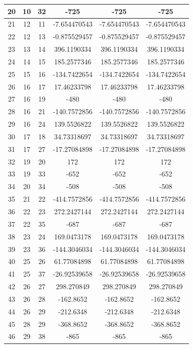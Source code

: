 \documentclass[lettersize,journal]{IEEEtran}
\begin{document}
\begin{table}[htbp]
\begin{tabular}{cccccc}
		\midrule
		20    & 10    & 32    & -725  & -725  & -725 \\
		\midrule
		21    & 12    & 11    & -7.654470543 & -7.654470543 & -7.654470543 \\
		\midrule
		22    & 12    & 13    & -0.875529457 & -0.875529457 & -0.875529457 \\
		\midrule
		23    & 13    & 14    & 396.1190334 & 396.1190334 & 396.1190334 \\
		\midrule
		24    & 14    & 15    & 185.2577346 & 185.2577346 & 185.2577346 \\
		\midrule
		25    & 15    & 16    & -134.7422654 & -134.7422654 & -134.7422654 \\
		\midrule
		26    & 16    & 17    & 17.46233798 & 17.46233798 & 17.46233798 \\
		\midrule
		27    & 16    & 19    & -480  & -480  & -480 \\
		\midrule
		28    & 16    & 21    & -140.7572856 & -140.7572856 & -140.7572856 \\
		\midrule
		29    & 16    & 24    & 139.5526822 & 139.5526822 & 139.5526822 \\
		\midrule
		30    & 17    & 18    & 34.73318697 & 34.73318697 & 34.73318697 \\
		\midrule
		31    & 17    & 27    & -17.27084898 & -17.27084898 & -17.27084898 \\
		\midrule
		32    & 19    & 20    & 172   & 172   & 172 \\
		\midrule
		33    & 19    & 33    & -652  & -652  & -652 \\
		\midrule
		34    & 20    & 34    & -508  & -508  & -508 \\
		\midrule
		35    & 21    & 22    & -414.7572856 & -414.7572856 & -414.7572856 \\
		\midrule
		36    & 22    & 23    & 272.2427144 & 272.2427144 & 272.2427144 \\
		\midrule
		37    & 22    & 35    & -687  & -687  & -687 \\
		\midrule
		38    & 23    & 24    & 169.0473178 & 169.0473178 & 169.0473178 \\
		\midrule
		39    & 23    & 36    & -144.3046034 & -144.3046034 & -144.3046034 \\
		\midrule
		40    & 25    & 26    & 61.77084898 & 61.77084898 & 61.77084898 \\
		\midrule
		41    & 25    & 37    & -26.92539658 & -26.92539658 & -26.92539658 \\
		\midrule
		42    & 26    & 27    & 298.270849 & 298.270849 & 298.270849 \\
		\midrule
		43    & 26    & 28    & -162.8652 & -162.8652 & -162.8652 \\
		\midrule
		44    & 26    & 29    & -212.6348 & -212.6348 & -212.6348 \\
		\midrule
		45    & 28    & 29    & -368.8652 & -368.8652 & -368.8652 \\
		\midrule
		46    & 29    & 38    & -865  & -865  & -865 \\
		\bottomrule
	\end{tabular}%
	\label{tab:addlabel}%
\end{table}%
\end{document}
